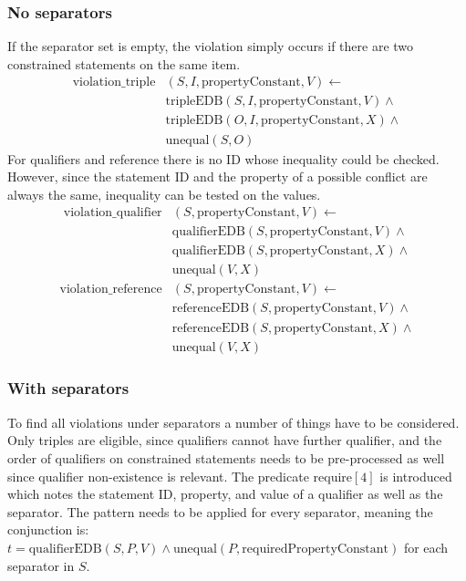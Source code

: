 \documentclass[hyperref,bachelorofscience,fleqn]{cgvpub}
\begin{document}
\subsubsection{No separators}
If the separator set is empty, the violation simply occurs if there are two constrained statements on the same item. 
\begin{equation}\label{eq_no_separators_triple}
\begin{split}
\text{violation\_triple}&(S, I, \text{propertyConstant}, V) \leftarrow \\
&\text{tripleEDB}(S, I, \text{propertyConstant}, V) \wedge \\
&\text{tripleEDB}(O, I, \text{propertyConstant}, X) \wedge \\
&\text{unequal}(S, O)
\end{split}
\end{equation}
For qualifiers and reference there is no ID whose inequality could be checked. However, since the statement ID and the property of a possible conflict are always the same, inequality can be tested on the values.
\begin{equation*}
\begin{split}
\text{violation\_qualifier}&(S, \text{propertyConstant}, V) \leftarrow \\
&\text{qualifierEDB}(S, \text{propertyConstant}, V) \wedge \\
&\text{qualifierEDB}(S, \text{propertyConstant}, X) \wedge \\
&\text{unequal}(V, X)
\end{split}
\end{equation*}
\begin{equation*}
\begin{split}
\text{violation\_reference}&(S, \text{propertyConstant}, V) \leftarrow \\
&\text{referenceEDB}(S, \text{propertyConstant}, V) \wedge \\
&\text{referenceEDB}(S, \text{propertyConstant}, X) \wedge \\
&\text{unequal}(V, X)
\end{split}
\end{equation*}

\subsubsection{With separators}\label{subsubsec_with_separators}
To find all violations under separators a number of things have to be considered. Only triples are eligible, since qualifiers cannot have further qualifier, and the order of qualifiers on constrained statements needs to be pre-processed as well since qualifier non-existence is relevant. The predicate require\([4]\) is introduced which notes the statement ID, property, and value of a qualifier as well as the separator. The pattern needs to be applied for every separator, meaning the conjunction is: \(t = \text{qualifierEDB}(S, P, V) \wedge \text{unequal}(P, \text{requiredPropertyConstant})\) for each separator in \(S\).\\
\end{document}
